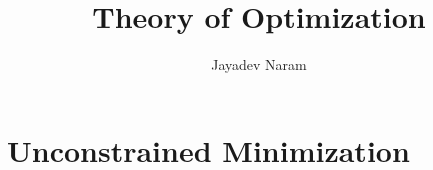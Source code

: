 \documentclass[11pt,a4paper]{article}
\author{Jayadev Naram}
\title{Theory of Optimization}
\begin{document}
\date{}
\maketitle
\tableofcontents
\newpage

\theoremstyle{plain}
\newtheorem{theorem}{Theorem}[section]
\newtheorem{corollary}{Corollary}[theorem]

\newtheorem{lemma}[theorem]{Lemma}
\newtheorem{proposition}[theorem]{Proposition}
\newtheorem{assume}{Assumption}

\theoremstyle{definition}
\newtheorem{definition}[theorem]{Definition}
\newtheorem{example}[theorem]{Example}
\newtheorem{remark}[theorem]{Remark}

\newcommand{\R}{\mathbb{R}}
\newcommand{\B}{\mathbb{B}}
\newcommand{\A}{\mathcal{A}}
\newcommand{\M}{\mathcal{M}}
\newcommand{\N}{\mathcal{N}}
\newcommand{\h}{\mathcal{H}}
\newcommand{\T}{\mathcal{T}}
\newcommand{\Prob}{\mathbb{P}}
\newcommand{\Dist}{\mathcal{D}}
\newcommand{\perpProj}{\mathcal{P}^\perp}
\newcommand{\bb}{\mathbb{B}}
\newcommand{\Sprod}{\mathbb{S}_{xy}}
\newcommand{\highlight}[1]{\underline{\textit{\textbf{#1}}}}
\newcommand{\mapping}[3]{#1:#2\rightarrow #3}
\newcommand{\doubt}{\highlight{[??]}}
\newcommand{\bigvert}[2]{\left.#1\right|_{#2}}
\newcommand{\sdnn}[1]{${#1}$}
\newcommand{\bsdnn}[1]{$\boldsymbol{#1}$}
\newcommand{\ifthen}[2]{\textbf{(#1)}\boldsymbol{\implies}\textbf{(#2)}}
\newcommand{\bsdn}[1]{\boldsymbol{#1}}
\newcommand{\forward}{$(\implies)$\ }
\newcommand{\converse}{$(\impliedby)$\ }
\newcommand{\Lt}[1]{\underset{#1\rightarrow 0}{Lt}}
\newcommand{\norm}[1]{\|#1\|}
\newcommand{\dparder}[2]{\dfrac{\partial #1}{\partial x_{#2}}}
\newcommand{\fparder}[2]{\frac{\partial #1}{\partial x_{#2}}}
\newcommand{\parder}[2]{\partial #1/\partial x_{#2}}
\newcommand{\parop}[1]{\dfrac{\partial}{\partial x_{#1}}}
\newcommand{\innerproduct}[2]{\langle #1, #2 \rangle}
\newcommand{\metric}[2]{[#1, #2]}
\newcommand{\genst}{St_B(n,p)}
\newcommand{\igenst}[1]{St_{B_{#1}}(n_{#1},p)}
\newcommand{\realmat}[2]{\R^{#1\times #2}}
\newcommand{\Skew}{\mathcal{S}_{skew}(p)}
\newcommand{\Sym}{\mathcal{S}_{sym}(p)}
\newcommand{\XperpB}{X_{B^\perp}}
\newcommand{\polarRetr}{R^{polar}_X}
\newcommand{\qrRetr}{R^{QR}_X}
\newcommand{\vectransport}{\mathcal{T}}
\newcommand{\grad}{\text{grad}\,}
\newcommand{\hess}{\text{Hess}\,}

\section{Unconstrained Minimization}
\end{document}
